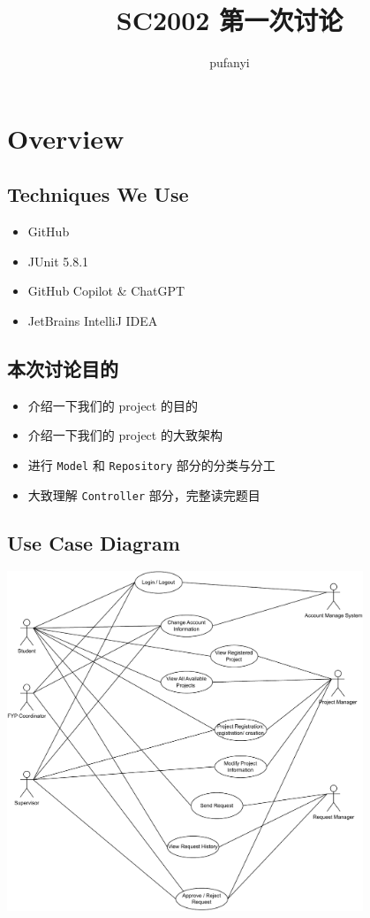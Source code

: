 \documentclass[hyperref,UTF8,12pt,a4paper]{ctexart}
\title{SC2002 第一次讨论}
\author{pufanyi}
\date{}
\begin{document}
\maketitle

\newpage

\tableofcontents

\newpage

\section{Overview}

\subsection{Techniques We Use}

\begin{itemize}
	\item GitHub
	\item JUnit 5.8.1
	\item GitHub Copilot \& ChatGPT
	\item JetBrains IntelliJ IDEA
\end{itemize}

\subsection{本次讨论目的}

\begin{itemize}
	\item 介绍一下我们的 project 的目的
	\item 介绍一下我们的 project 的大致架构
	\item 进行 \texttt{Model} 和 \texttt{Repository} 部分的分类与分工
	\item 大致理解 \texttt{Controller} 部分，完整读完题目
\end{itemize}

\subsection{Use Case Diagram}

\includegraphics[width=0.8\textwidth]{diagrams/use_case_diagram.pdf}
\end{document}
